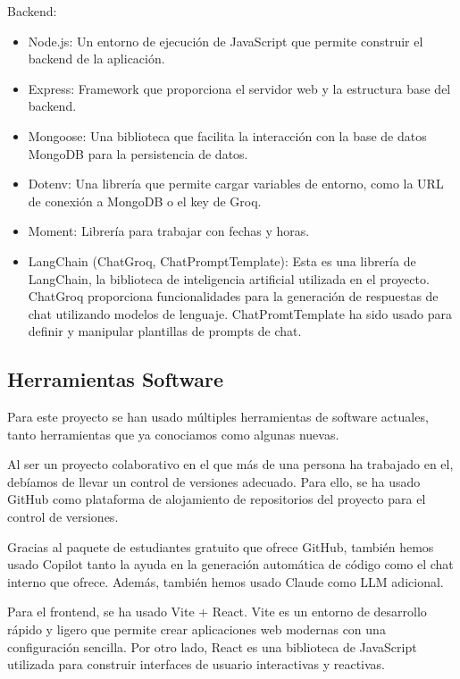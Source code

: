 \documentclass[12pt,epsf,titlepage,a4paper]{article}
\begin{document}
Backend:

\begin{itemize}
    \item Node.js: Un entorno de ejecución de JavaScript que permite construir el backend de la aplicación.
    \item Express: Framework que proporciona el servidor web y la estructura base del backend.
    \item Mongoose: Una biblioteca que facilita la interacción con la base de datos MongoDB para la persistencia de datos.
    \item Dotenv: Una librería que permite cargar variables de entorno, como la URL de conexión a MongoDB o el key de Groq.
    \item Moment: Librería para trabajar con fechas y horas.
    \item LangChain (ChatGroq, ChatPromptTemplate): Esta es una librería de LangChain, la biblioteca de inteligencia artificial utilizada en el proyecto. ChatGroq proporciona funcionalidades para la generación de respuestas de chat utilizando modelos de lenguaje. ChatPromtTemplate ha sido usado para definir y manipular plantillas de prompts de chat.


\end{itemize}

\subsection{Herramientas Software}

Para este proyecto se han usado múltiples herramientas de software actuales, tanto herramientas que ya conociamos como algunas nuevas. 

Al ser un proyecto colaborativo en el que más de una persona ha trabajado en el, debíamos de llevar un control de versiones adecuado. Para ello, se ha usado GitHub como plataforma de alojamiento de repositorios del proyecto para el control de versiones.

Gracias al paquete de estudiantes gratuito que ofrece GitHub, también hemos usado Copilot tanto la ayuda en la generación automática de código como el chat interno que ofrece. Además, también hemos usado Claude como LLM adicional.

Para el frontend, se ha usado Vite + React. Vite es un entorno de desarrollo rápido y ligero que permite crear aplicaciones web modernas con una configuración sencilla. Por otro lado, React es una biblioteca de JavaScript utilizada para construir interfaces de usuario interactivas y reactivas.
\end{document}
